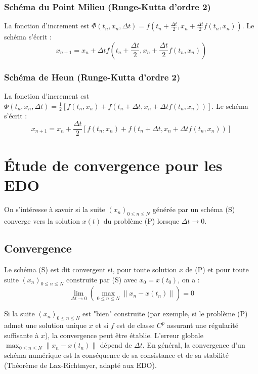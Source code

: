 \subsubsection{Schéma du Point Milieu (Runge-Kutta d'ordre 2)}
La fonction d'increment est $\Phi(t_n, x_n, \Delta t) = f\left(t_n + \frac{\Delta t}{2}, x_n + \frac{\Delta t}{2} f(t_n, x_n)\right)$. Le schéma s'écrit :
\[
x_{n+1} = x_n + \Delta t f\left(t_n + \frac{\Delta t}{2}, x_n + \frac{\Delta t}{2} f(t_n, x_n)\right)
\]

\subsubsection{Schéma de Heun (Runge-Kutta d'ordre 2)}
La fonction d'increment est $\Phi(t_n, x_n, \Delta t) = \frac{1}{2} \left[ f(t_n, x_n) + f(t_n + \Delta t, x_n + \Delta t f(t_n, x_n)) \right]$. Le schéma s'écrit :
\[
x_{n+1} = x_n + \frac{\Delta t}{2} \left[ f(t_n, x_n) + f(t_n + \Delta t, x_n + \Delta t f(t_n, x_n)) \right]
\]

\section{Étude de convergence pour les EDO}
On s'intéresse à savoir si la suite $(x_n)_{0 \le n \le N}$ générée par un schéma (S) converge vers la solution $x(t)$ du problème (P) lorsque $\Delta t \to 0$.

\subsection{Convergence}
\begin{definition}
Le schéma (S) est dit convergent si, pour toute solution $x$ de (P) et pour toute suite $(x_n)_{0 \le n \le N}$ construite par (S) avec $x_0 = x(t_0)$, on a :
\[
\lim_{\Delta t \to 0} \left( \max_{0 \le n \le N} \|x_n - x(t_n)\| \right) = 0
\]
\end{definition}
\begin{remark}
Si la suite $(x_n)_{0 \le n \le N}$ est "bien" construite (par exemple, si le problème (P) admet une solution unique $x$ et si $f$ est de classe $C^p$ assurant une régularité suffisante à $x$), la convergence peut être établie. L'erreur globale $\max_{0 \le n \le N} \|x_n - x(t_n)\|$ dépend de $\Delta t$. En général, la convergence d'un schéma numérique est la conséquence de sa consistance et de sa stabilité (Théorème de Lax-Richtmyer, adapté aux EDO).
\end{remark}

